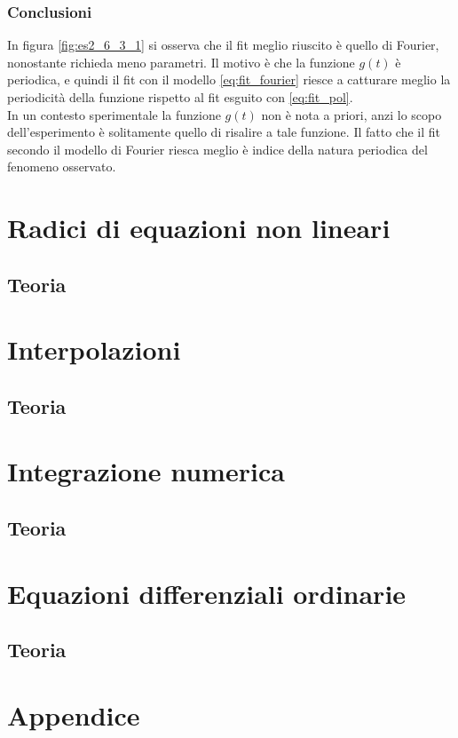 \documentclass[letterpaper, 12pt]{article}
\begin{document}
\subsubsection{Conclusioni}
In figura \ref{fig:es2_6_3_1} si osserva che il fit meglio riuscito è quello di Fourier, nonostante
richieda meno parametri. Il motivo è che la funzione $g(t)$ è periodica, e quindi il fit con il modello 
\ref{eq:fit_fourier} riesce a catturare meglio la periodicità della funzione rispetto al fit esguito con 
\ref{eq:fit_pol}. \\
In un contesto sperimentale la funzione $g(t)$ non è nota a priori, anzi lo scopo dell'esperimento è 
solitamente quello di risalire a tale funzione. Il fatto che il fit secondo il modello di Fourier riesca meglio
è indice della natura periodica del fenomeno osservato. 

\section{Radici di equazioni non lineari}
\subsection{Teoria}

\section{Interpolazioni}
\subsection{Teoria}

\section{Integrazione numerica}
\subsection{Teoria}

\section{Equazioni differenziali ordinarie}
\subsection{Teoria}

\section{Appendice}
\end{document}
